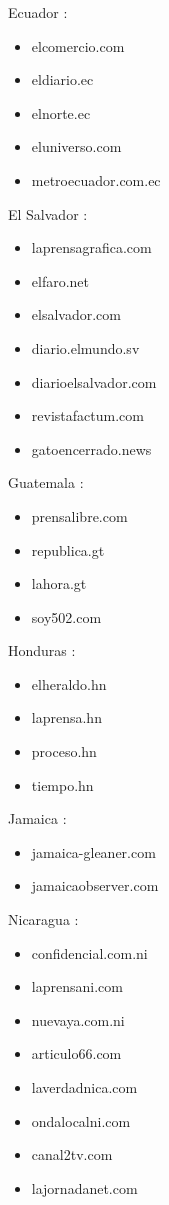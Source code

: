 \documentclass[
  letterpaper,
  DIV=11,
  numbers=noendperiod]{scrartcl}
\providecommand{\tightlist}{%
  \setlength{\itemsep}{0pt}\setlength{\parskip}{0pt}}\usepackage{longtable,booktabs,array}
\begin{document}
Ecuador :

\begin{itemize}
\tightlist
\item
  elcomercio.com
\item
  eldiario.ec
\item
  elnorte.ec
\item
  eluniverso.com
\item
  metroecuador.com.ec
\end{itemize}

El Salvador :

\begin{itemize}
\tightlist
\item
  laprensagrafica.com
\item
  elfaro.net
\item
  elsalvador.com
\item
  diario.elmundo.sv
\item
  diarioelsalvador.com
\item
  revistafactum.com
\item
  gatoencerrado.news
\end{itemize}

Guatemala :

\begin{itemize}
\tightlist
\item
  prensalibre.com
\item
  republica.gt
\item
  lahora.gt
\item
  soy502.com
\end{itemize}

Honduras :

\begin{itemize}
\tightlist
\item
  elheraldo.hn
\item
  laprensa.hn
\item
  proceso.hn
\item
  tiempo.hn
\end{itemize}

Jamaica :

\begin{itemize}
\tightlist
\item
  jamaica-gleaner.com
\item
  jamaicaobserver.com
\end{itemize}

Nicaragua :

\begin{itemize}
\tightlist
\item
  confidencial.com.ni
\item
  laprensani.com
\item
  nuevaya.com.ni
\item
  articulo66.com
\item
  laverdadnica.com
\item
  ondalocalni.com
\item
  canal2tv.com
\item
  lajornadanet.com
\end{itemize}
\end{document}
